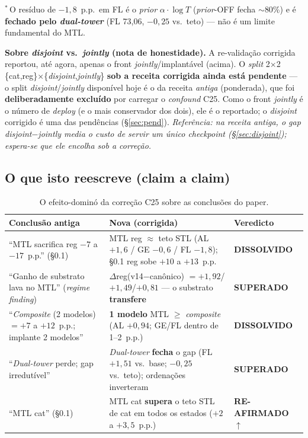 \documentclass[11pt,a4paper]{article}
\newcommand{\good}[1]{\textcolor{green!45!black}{\textbf{#1}}}
\newcommand{\note}[1]{\textcolor{black!55}{\textit{#1}}}
\begin{document}
\noindent$^{*}$\,O resíduo de $-1{,}8$~p.p.\ em FL é o \textit{prior} $\alpha\cdot\log T$
(\textit{prior}-OFF fecha $\sim$80\%) e é \textbf{fechado pelo \textit{dual-tower}} (FL 73,06,
$-0{,}25$ vs.\ teto) --- não é um limite fundamental do MTL.

\medskip
\noindent\textbf{Sobre \textit{disjoint} vs.\ \textit{jointly} (nota de honestidade).} A re-validação
corrigida reportou, até agora, apenas o front \textit{jointly}/implantável (acima). O \emph{split} 2$\times$2
\{cat,reg\}$\times$\{\textit{disjoint},\textit{jointly}\} \textbf{sob a receita corrigida ainda está
pendente} --- o split \textit{disjoint}/\textit{jointly} disponível hoje é o da receita \emph{antiga}
(ponderada), que foi \textbf{deliberadamente excluído} por carregar o \textit{confound} C25. Como o
front \textit{jointly} é o número de \textit{deploy} (e o mais conservador dos dois), ele é o reportado;
o \textit{disjoint} corrigido é uma das pendências (\S\ref{sec:pend}). \note{Referência: na receita
antiga, o gap \textit{disjoint}$-$\textit{jointly} media o custo de servir um único \textit{checkpoint}
(\S\ref{sec:disjoint}); espera-se que ele encolha sob a correção.}

\subsection{O que isto reescreve (claim a claim)}

\begin{table}[H]
\centering
\footnotesize
\caption{O efeito-dominó da correção C25 sobre as conclusões do paper.}
\renewcommand{\arraystretch}{1.25}
\begin{tabular}{p{4.6cm}p{6.0cm}p{2.4cm}}
\toprule
\textbf{Conclusão antiga} & \textbf{Nova (corrigida)} & \textbf{Veredicto} \\
\midrule
``MTL sacrifica reg $-7$ a $-17$~p.p.'' (\S0.1) & MTL reg $\approx$ teto STL (AL $+1{,}6$ / GE $-0{,}6$ / FL $-1{,}8$); \S0.1 reg sobe $+10$ a $+13$~p.p. & \good{DISSOLVIDO} \\
``Ganho de substrato lava no MTL'' (\textit{regime finding}) & $\Delta$reg(v14$-$canônico) $= +1{,}92$/$+1{,}49$/$+0{,}81$ --- o substrato \textbf{transfere} & \good{SUPERADO} \\
``\textit{Composite} (2 modelos) $= +7$ a $+12$~p.p.; implante 2 modelos'' & \textbf{1 modelo} MTL $\ge$ \textit{composite} (AL $+0{,}94$; GE/FL dentro de 1--2~p.p.) & \good{DISSOLVIDO} \\
``\textit{Dual-tower} perde; gap irredutível'' & \textit{Dual-tower} \textbf{fecha} o gap (FL $+1{,}51$ vs.\ base; $-0{,}25$ vs.\ teto); ordenações inverteram & \good{SUPERADO} \\
``MTL cat'' (\S0.1) & MTL cat \textbf{supera} o teto STL de cat em todos os estados ($+2$ a $+3{,}5$~p.p.) & \good{RE-AFIRMADO $\uparrow$} \\
\bottomrule
\end{tabular}
\end{table}
\end{document}
